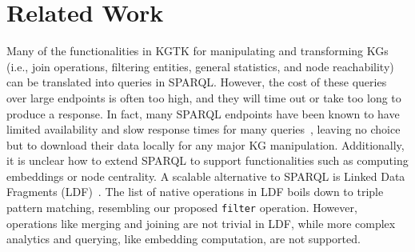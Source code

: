 \documentclass[runningheads]{llncs}
\newcommand{\kibitz}[2]{%
{\color{#1}#2}{}%
}
\newcommand{\filip}[1]{\kibitz{purple}{[FI:#1]}} %
\newcommand{\DG}[1]{\kibitz{red}{[DG: #1]}} %
\begin{document}











\section{Related Work}\label{sec:relWork}
Many of the functionalities in KGTK for manipulating and transforming KGs (i.e., join operations, filtering entities, general statistics, and node reachability) can be translated into queries in SPARQL. However, the cost of these queries over large endpoints is often too high, and they will time out or take too long to produce a response. In fact, many SPARQL endpoints have been known to have limited availability and slow response times for many queries~\cite{buil2013sparql}, leaving no choice but to download their data locally for any major KG manipulation. 
Additionally, it is unclear how to extend SPARQL to support functionalities  such as computing embeddings or node centrality.
A scalable alternative to SPARQL is Linked Data Fragments (LDF)~\cite{verborgh2014web}. The list of native operations in LDF boils down to triple pattern matching, resembling our proposed \texttt{filter} operation. However, operations like merging and joining are not trivial in LDF, while more complex analytics and querying, like embedding computation, are not supported. %
\end{document}
